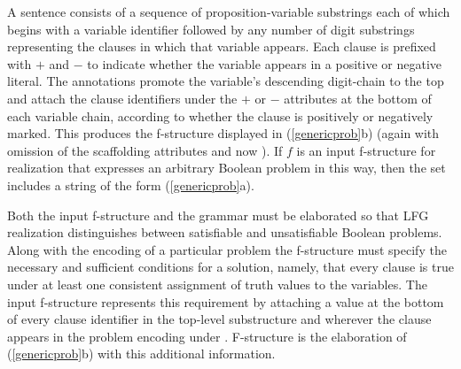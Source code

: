 \documentclass[output=paper,hidelinks]{langscibook}
\begin{document}
\noindent A sentence consists of a sequence of proposition-variable substrings each of which begins with a variable identifier followed by any number of digit substrings representing the clauses in which that variable appears.  Each clause is prefixed with $+$ and $-$ to indicate whether the variable appears in a positive or negative literal. The annotations promote the variable's descending digit-chain to the top and attach the clause identifiers under the $+$ or $-$ attributes at the bottom of each variable chain, according to whether the clause is positively or negatively marked.  This produces the f-structure displayed in (\ref{genericprob}b) (again with omission of the scaffolding attributes  and now ). If $f$ is an input f-structure for realization that expresses an arbitrary Boolean problem in this way, then the set  includes a string of the form (\ref{genericprob}a).

Both the input f-structure and the grammar must be elaborated so that LFG realization distinguishes between satisfiable and unsatisfiable Boolean problems.  Along with the encoding of a particular problem the f-structure must specify the necessary and sufficient conditions for a solution, namely, that every clause is true under at least one consistent assignment of truth values to the variables. The input f-structure represents this requirement by attaching a value  at the bottom of every clause identifier in the top-level  substructure and wherever the clause appears in the problem encoding under . F-structure  is the elaboration of (\ref{genericprob}b) with this additional information.

\ea\label{gensolfs}
\z
\end{document}
